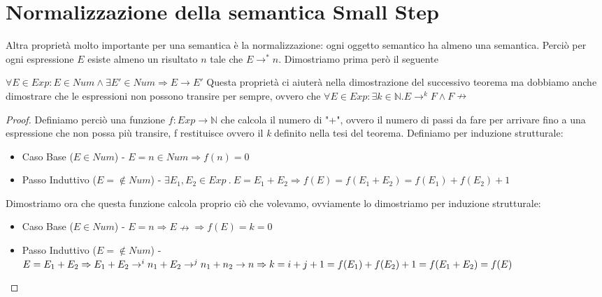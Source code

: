\section{Normalizzazione della semantica Small Step} 
Altra proprietà molto importante per una semantica è la normalizzazione:
ogni oggetto semantico ha almeno una semantica. Perciò per ogni espressione $E$
esiste almeno un risultato $n$ tale che $E \rightarrow ^* n$.
Dimostriamo prima però il seguente

\begin{teorema}
  $\forall E \in Exp : E \in Num \land \exists E' \in Num \Rightarrow E \rightarrow E'$
  Questa proprietà ci aiuterà nella dimostrazione del successivo teorema ma dobbiamo anche dimostrare che le espressioni non possono transire per sempre,
  ovvero che $\forall E \in Exp : \exists k \in \mathbb{N} . E \rightarrow ^k F \land F \nrightarrow$
\end{teorema}

\begin{proof}
  Definiamo perciò una funzione $f : Exp \rightarrow \mathbb{N}$ che calcola il numero di "+", ovvero il numero di passi da fare per arrivare fino a una
  espressione che non possa più transire, f restituisce ovvero il \emph{k} definito nella tesi del teorema. Definiamo per induzione strutturale:
  \begin{itemize}
    \item Caso Base ($E \in Num$) - $E = n \in Num \Rightarrow f(n) = 0$
    \item Passo Induttivo ($E = \not \in Num$) - $\exists E_1, E_2 \in Exp\ .\ E = E_1 + E_2 \Rightarrow f(E) = f(E_1 + E_2) = f(E_1) + f(E_2) + 1$
  \end{itemize}
  Dimostriamo ora che questa funzione calcola proprio ciò che volevamo, ovviamente lo dimostriamo per induzione strutturale:
  \begin{itemize}
  \item Caso Base ($E \in Num$) - $E = n \Rightarrow E \nrightarrow \Rightarrow f(E) = k = 0$
  \item Passo Induttivo ($E = \not \in Num$) - $E = E_1 + E_2 \Rightarrow \\ E_1 + E_2 \rightarrow ^i n_1 + E_2 \rightarrow ^j n_1 + n_2 \rightarrow n \\
    \Rightarrow k = i + j + 1 = f(E_1) + f(E_2) + 1 = f(E_1 + E_2) = f(E)$
  \end{itemize}
\end{proof}

